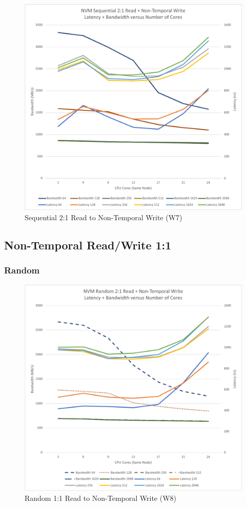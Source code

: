 \begin{figure}
    \centering
    \caption{Sequential 2:1 Read to Non-Temporal Write (W7)}\label{chart:sequential:W7}
    \includegraphics[scale=0.5]{charts/sequential-w7-crop.pdf}
\end{figure}


\subsection{Non-Temporal Read/Write 1:1}

\subsubsection{Random}

\begin{figure}
    \centering
    \caption{Random 1:1 Read to Non-Temporal Write (W8)}\label{chart:random:W8}
    \includegraphics[scale=0.5]{charts/random-w8-crop.pdf}
\end{figure}

